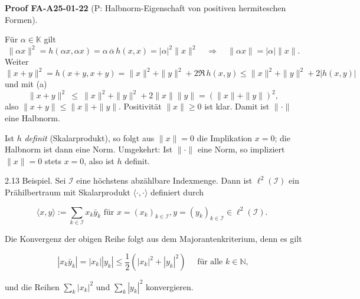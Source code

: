 \documentclass[10pt, letterpaper]{article}
\newcommand{\CustomHeading}[3]{%
  \par\medskip\noindent%
  \textbf{#1 #2} \textnormal{(#3)}.\enskip%
}
\newenvironment{PROOF}[2]{\begin{unitbox}\CustomHeading{Proof}{#1}{#2}}{\end{unitbox}}
\begin{document}
\begin{PROOF}{FA-A25-01-22}{P: Halbnorm-Eigenschaft von positiven hermiteschen Formen}
Für $\alpha\in\mathbb{K}$ gilt
\[
\|\alpha x\|^{2}=h(\alpha x,\alpha x)=\alpha\,\overline{\alpha}\,h(x,x)=|\alpha|^{2}\|x\|^{2}
\quad\Rightarrow\quad \|\alpha x\|=|\alpha|\|x\|.
\]
Weiter
\[
\|x+y\|^{2}=h(x+y,x+y)=\|x\|^{2}+\|y\|^{2}+2\Re\,h(x,y)
\le \|x\|^{2}+\|y\|^{2}+2|h(x,y)|
\]
und mit (a)
\[
\|x+y\|^{2}\ \le\ \|x\|^{2}+\|y\|^{2}+2\|x\|\|y\|=(\|x\|+\|y\|)^{2},
\]
also $\|x+y\|\le \|x\|+\|y\|$. Positivität $\|x\|\ge 0$ ist klar. Damit ist $\|\cdot\|$ eine Halbnorm.

Ist $h$ \emph{definit} (Skalarprodukt), so folgt aus $\|x\|=0$ die Implikation $x=0$; die Halbnorm ist dann eine Norm.
Umgekehrt: Ist $\|\cdot\|$ eine Norm, so impliziert $\|x\|=0$ stets $x=0$, also ist $h$ definit.
\end{PROOF}





2.13 Beispiel. Sei $\mathcal{I}$ eine höchstens abzählbare Indexmenge. Dann ist $\ell^{2}(\mathcal{I})$ ein Prähilbertraum mit Skalarprodukt $\langle\cdot, \cdot\rangle$ definiert durch

$$
\langle x, y\rangle:=\sum_{k \in \mathcal{I}} x_{k} \bar{y}_{k} \text { für } x=\left(x_{k}\right)_{k \in \mathcal{I}}, y=\left(y_{k}\right)_{k \in \mathcal{I}} \in \ell^{2}(\mathcal{I}) \text {. }
$$

Die Konvergenz der obigen Reihe folgt aus dem Majorantenkriterium, denn es gilt

$$
\left|x_{k} \bar{y}_{k}\right|=\left|x_{k}\right|\left|y_{k}\right| \leq \frac{1}{2}\left(\left|x_{k}\right|^{2}+\left|y_{k}\right|^{2}\right) \quad \text { für alle } k \in \mathbb{N},
$$

und die Reihen $\sum_{k}\left|x_{k}\right|^{2}$ und $\sum_{k}\left|y_{k}\right|^{2}$ konvergieren.
\end{document}
